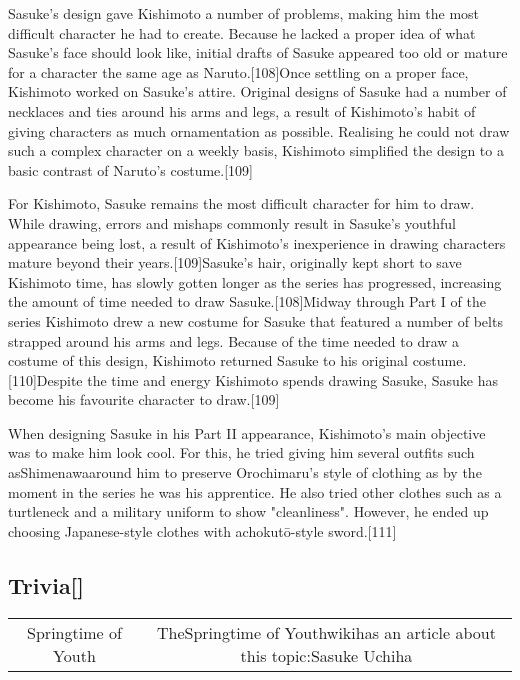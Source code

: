 \documentclass[a4paper,12pt]{article}
\begin{document}
Sasuke's design gave Kishimoto a number of problems, making him the most difficult character he had to create. Because he lacked a proper idea of what Sasuke's face should look like, initial drafts of Sasuke appeared too old or mature for a character the same age as Naruto.[108]Once settling on a proper face, Kishimoto worked on Sasuke's attire. Original designs of Sasuke had a number of necklaces and ties around his arms and legs, a result of Kishimoto's habit of giving characters as much ornamentation as possible. Realising he could not draw such a complex character on a weekly basis, Kishimoto simplified the design to a basic contrast of Naruto's costume.[109]\\ \par \vspace{0.5cm}

For Kishimoto, Sasuke remains the most difficult character for him to draw. While drawing, errors and mishaps commonly result in Sasuke's youthful appearance being lost, a result of Kishimoto's inexperience in drawing characters mature beyond their years.[109]Sasuke's hair, originally kept short to save Kishimoto time, has slowly gotten longer as the series has progressed, increasing the amount of time needed to draw Sasuke.[108]Midway through Part I of the series Kishimoto drew a new costume for Sasuke that featured a number of belts strapped around his arms and legs. Because of the time needed to draw a costume of this design, Kishimoto returned Sasuke to his original costume.[110]Despite the time and energy Kishimoto spends drawing Sasuke, Sasuke has become his favourite character to draw.[109]\\ \par \vspace{0.5cm}

When designing Sasuke in his Part II appearance, Kishimoto's main objective was to make him look cool. For this, he tried giving him several outfits such asShimenawaaround him to preserve Orochimaru's style of clothing as by the moment in the series he was his apprentice. He also tried other clothes such as a turtleneck and a military uniform to show "cleanliness". However, he ended up choosing Japanese-style clothes with achokutō-style sword.[111]\\ \par \vspace{0.5cm}

\subsection*{Trivia[]}\n\n\begin{tabular}{|c|c|} \hline
Springtime of Youth & TheSpringtime of Youthwikihas an article about this topic:Sasuke Uchiha \\
\end{tabular}\\ \par \vspace{0.5cm}
\end{document}
